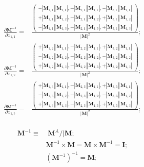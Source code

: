 \documentclass[twoside]{article}
\numberwithin{equation}{section}
\begin{document}
\begin{align*}
\frac{\partial \mathbf{M}^{-1}}{\partial x_{1,1}} =& \frac{\left( \begin{matrix} 
-|\mathbf{M}_{1,1}||\mathbf{M}_{1,1}|,  +|\mathbf{M}_{2,1}||\mathbf{M}_{1,1}|, -|\mathbf{M}_{3,1}||\mathbf{M}_{1,1}| \\
+|\mathbf{M}_{1,1}||\mathbf{M}_{1,2}|, -|\mathbf{M}_{2,1}||\mathbf{M}_{1,2}|,  +|\mathbf{M}_{3,1}||\mathbf{M}_{1,2}| \\
-|\mathbf{M}_{1,1}||\mathbf{M}_{1,3}|, +|\mathbf{M}_{2,1}||\mathbf{M}_{1,3}|, +|\mathbf{M}_{3,1}||\mathbf{M}_{1,3}|
\end{matrix} \right)}{|\mathbf{M}|^2}; \\
\frac{\partial \mathbf{M}^{-1}}{\partial x_{1,2}} =& \frac{\left( \begin{matrix} 
+|\mathbf{M}_{1,2}||\mathbf{M}_{1,1}|,  -|\mathbf{M}_{2,2}||\mathbf{M}_{1,1}|, +|\mathbf{M}_{3,2}||\mathbf{M}_{1,1}| \\
-|\mathbf{M}_{1,2}||\mathbf{M}_{1,2}|, +|\mathbf{M}_{2,2}||\mathbf{M}_{1,2}|,  -|\mathbf{M}_{3,2}||\mathbf{M}_{1,2}| \\
+|\mathbf{M}_{1,2}||\mathbf{M}_{1,3}|, -|\mathbf{M}_{2,2}||\mathbf{M}_{1,3}|, +|\mathbf{M}_{3,2}||\mathbf{M}_{1,3}|
\end{matrix} \right)}{|\mathbf{M}|^2}; \\
\frac{\partial \mathbf{M}^{-1}}{\partial x_{1,3}} =& \frac{\left( \begin{matrix} 
+|\mathbf{M}_{1,3}||\mathbf{M}_{1,1}|,  -|\mathbf{M}_{2,3}||\mathbf{M}_{1,1}|, +|\mathbf{M}_{3,3}||\mathbf{M}_{1,1}| \\
-|\mathbf{M}_{1,3}||\mathbf{M}_{1,2}|, +|\mathbf{M}_{2,3}||\mathbf{M}_{1,2}|,  -|\mathbf{M}_{3,3}||\mathbf{M}_{1,2}| \\
+|\mathbf{M}_{1,3}||\mathbf{M}_{1,3}|, -|\mathbf{M}_{2,3}||\mathbf{M}_{1,3}|, +|\mathbf{M}_{3,3}||\mathbf{M}_{1,3}|
\end{matrix} \right)}{|\mathbf{M}|^2}; \\
\end{align*}

\fi



\begin{align}
\label{eqn: inverse matrix}
\mathbf{M}^{-1} \equiv&\; \mathbf{M}^A / |\mathbf{M}; \\
\label{eqn: matrix inversion}
&\mathbf{M}^{-1} \times \mathbf{M} = \mathbf{M} \times \mathbf{M}^{-1} = \mathbf{I}; \\
\label{eqn: matrix double inversion}
&(\mathbf{M}^{-1})^{-1} = \mathbf{M};
\end{align}
\end{document}
